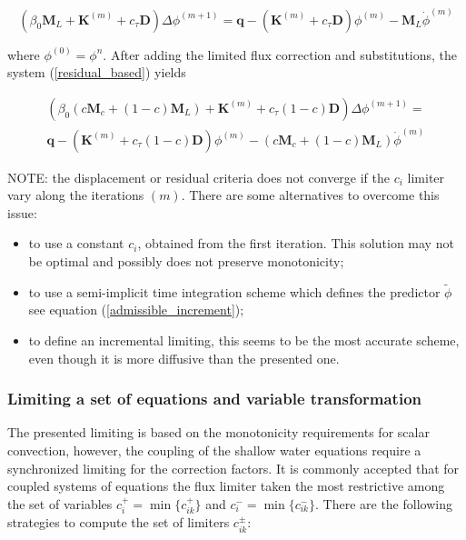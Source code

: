\begin{equation} \label{residual_based}
\left(\beta_0 \mathbf{M}_L + \mathbf{K}^{(m)} + c_\tau\mathbf{D}\right) \Delta\phi^{(m+1)} =
\mathbf{q} - \left(\mathbf{K}^{(m)} + c_\tau\mathbf{D}\right)\phi^{(m)}
-\mathbf{M}_L\dot{\phi}^{(m)}
\end{equation}

where $\phi^{(0)} = \phi^n$. After adding the limited flux correction and substitutions, the system (\ref{residual_based}) yields

\begin{multline}
\left(\beta_0 (c\mathbf{M}_c + (1-c)\mathbf{M}_L)
    + \mathbf{K}^{(m)} + c_\tau(1-c)\mathbf{D}\right) \Delta\phi^{(m+1)} = \\
\mathbf{q} -\left( \mathbf{K}^{(m)} + c_\tau(1-c)\mathbf{D} \right) \phi^{(m)}
    - \left(c\mathbf{M}_c + (1-c)\mathbf{M}_L \right) \dot{\phi}^{(m)}
\end{multline}




NOTE: the displacement or residual criteria does not converge if the $c_i$ limiter vary along the iterations $(m)$. There are some alternatives to overcome this issue:
\begin{itemize}
    \item to use a constant $c_i$, obtained from the first iteration. This solution may not be optimal and possibly does not preserve monotonicity;
    \item to use a semi-implicit time integration scheme which defines the predictor $\tilde{\phi}$ see equation (\ref{admissible_increment});
    \item to define an incremental limiting, this seems to be the most accurate scheme, even though it is more diffusive than the presented one.
\end{itemize}



\subsubsection{Limiting a set of equations and variable transformation}

The presented limiting is based on the monotonicity requirements for scalar convection, however, the coupling of the shallow water equations require a synchronized limiting for the correction factors. It is commonly accepted that for coupled systems of equations the flux limiter taken the most restrictive among the set of variables $c_i^+ = \min\{c_{ik}^+\}$ and $c_i^- = \min\{c_{ik}^-\}$. There are the following strategies to compute the set of limiters $c_{ik}^\pm$:

